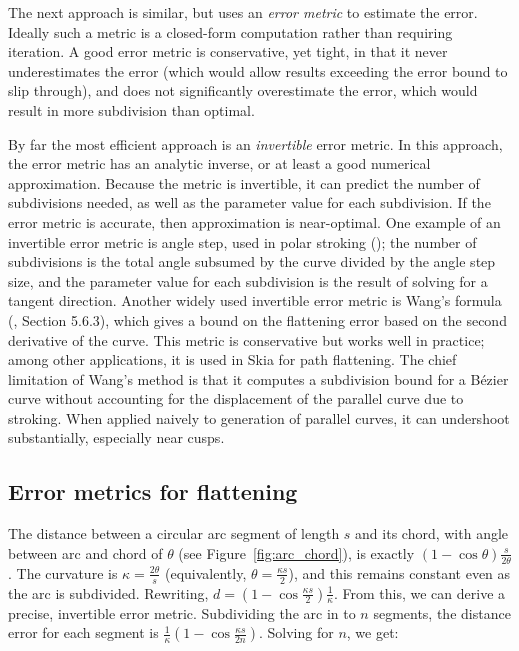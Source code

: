 \documentclass[sigconf, nonacm]{acmart}
\begin{document}

The next approach is similar, but uses an \emph{error metric} to estimate the error. Ideally such a metric is a closed-form computation rather than requiring iteration. A good error metric is conservative, yet tight, in that it never underestimates the error (which would allow results exceeding the error bound to slip through), and does not significantly overestimate the error, which would result in more subdivision than optimal.

By far the most efficient approach is an \emph{invertible} error metric. In this approach, the error metric has an analytic inverse, or at least a good numerical approximation. Because the metric is invertible, it can predict the number of subdivisions needed, as well as the parameter value for each subdivision. If the error metric is accurate, then approximation is near-optimal. One example of an invertible error metric is angle step, used in polar stroking (\citet{Kilgard2020}); the number of subdivisions is the total angle subsumed by the curve divided by the angle step size, and the parameter value for each subdivision is the result of solving for a tangent direction. Another widely used invertible error metric is Wang's formula (\citet{Goldman2003}, Section 5.6.3), which gives a bound on the flattening error based on the second derivative of the curve. This metric is conservative but works well in practice; among other applications, it is used in Skia for path flattening. The chief limitation of Wang's method is that it computes a subdivision bound for a Bézier curve without accounting for the displacement of the parallel curve due to stroking. When applied naively to generation of parallel curves, it can undershoot substantially, especially near cusps.


\subsection{Error metrics for flattening}

The distance between a circular arc segment of length $s$ and its chord, with angle between arc and chord of $\theta$ (see Figure~\ref{fig:arc_chord}), is exactly $(1-\cos \theta)\frac{s}{2\theta}$. The curvature is $\kappa = \frac{2\theta}{s}$ (equivalently, $\theta = \frac{\kappa s}{2}$), and this remains constant even as the arc is subdivided. Rewriting, $d = (1-\cos\frac{\kappa s}{2})\frac{1}{\kappa}$. From this, we can derive a precise, invertible error metric. Subdividing the arc in to $n$ segments, the distance error for each segment is $\frac{1}{\kappa}(1-\cos \frac{\kappa s}{2n})$. Solving for $n$, we get:
\end{document}
